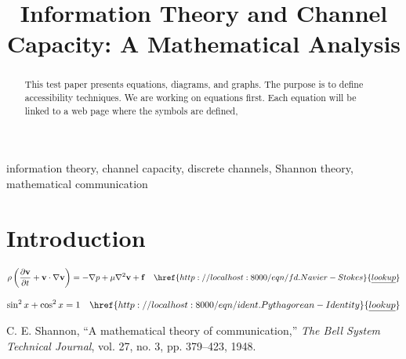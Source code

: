 \documentclass[conference]{IEEEtran}
\begin{document}
\title{Information Theory and Channel Capacity: A Mathematical Analysis}

\author{
}

\maketitle

\begin{abstract}
This test paper presents equations, diagrams, and graphs.
The purpose is to define accessibility techniques. We are working on equations first.
Each equation will be linked to a web page where the symbols are defined,
\end{abstract}

\begin{IEEEkeywords}
information theory, channel capacity, discrete channels, Shannon theory, mathematical communication
\end{IEEEkeywords}

\section{Introduction}
\begin{equation}
\rho \left(\frac{\partial \mathbf{v}}{\partial t} + \mathbf{v} \cdot \nabla \mathbf{v}\right) = -\nabla p + \mu \nabla^2 \mathbf{v} + \mathbf{f}\hspace{1em}\href{http://localhost:8000/eqn/fd.Navier-Stokes}{\underline{lookup}}
\label{eq:fd.Navier-Stokes}
\end{equation}

\begin{equation}
\sin^2 x + \cos^2 x = 1\hspace{1em}\href{http://localhost:8000/eqn/ident.Pythagorean-Identity}{\underline{lookup}}
\label{eq:ident.Pythagorean-Identity}
\end{equation}


\begin{thebibliography}{1}
C. E. Shannon, ``A mathematical theory of communication,'' \textit{The Bell System Technical Journal}, vol. 27, no. 3, pp. 379--423, 1948.
\end{thebibliography}
\end{document}

